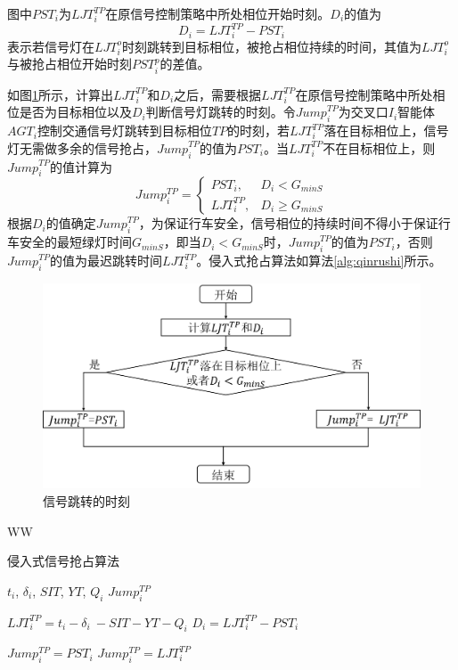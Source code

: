 图中${PST_i}$为${{LJT}_i^{TP}}$在原信号控制策略中所处相位开始时刻。${D_i}$的值为
\begin{equation}
	\label{equation:D_i}
	D_i={LJT}_i^{TP}-PST_i
\end{equation}
表示若信号灯在${{LJT}_i^o}$时刻跳转到目标相位，被抢占相位持续的时间，其值为${{LJT}_i^o}$与被抢占相位开始时刻${{PST}_i^p}$的差值。

如图\ref{fig:jump_time}所示，计算出${{LJT}_i^{TP}}$和${D_i}$之后，需要根据${{LJT}_i^{TP}}$在原信号控制策略中所处相位是否为目标相位以及${D_i}$判断信号灯跳转的时刻。令${{Jump}_i^{TP}}$为交叉口${I_i}$智能体${AGT_i}$控制交通信号灯跳转到目标相位${TP}$的时刻，若${{LJT}_i^{TP}}$落在目标相位上，信号灯无需做多余的信号抢占，${{Jump}_i^{TP}}$的值为${PST_i}$。当${{LJT}_i^{TP}}$不在目标相位上，则${{Jump}_i^{TP}}$的值计算为
\begin{equation}
	Jump_{i}^{TP}=
	\begin{cases}
		PST_{i}, & D_{i}<G_{minS} \\
		LJT_{i}^{TP}, & D_{i}\geqslant G_{minS}
	\end{cases}
	\label{equation:jump}
\end{equation}
根据${D_i}$的值确定${{Jump}_i^{TP}}$，为保证行车安全，信号相位的持续时间不得小于保证行车安全的最短绿灯时间${G_{minS}}$，即当${D_i<G_{minS}}$时，${{Jump}_i^{TP}}$的值为${PST_i}$，否则${{Jump}_i^{TP}}$的值为最迟跳转时间${{LJT}_i^{TP}}$。侵入式抢占算法如算法\ref{alg:qinrushi}所示。

\begin{figure}[ht]
	\centering
	\includegraphics[width=\textwidth]{figures/jump_time.png}
	\caption{信号跳转的时刻}
	\label{fig:jump_time}
\end{figure}WW

\begin{algorithm}[!ht]
	\renewcommand{\algorithmicrequire}{\textbf{Input:}}
	\renewcommand{\algorithmicensure}{\textbf{Output:}}
	\caption{侵入式信号抢占算法}
	\label{alg:qinrushi}
	\begin{algorithmic}[1]
		\REQUIRE ${t_i}$, ${\delta_i}$, ${SIT}$, ${YT}$, ${Q_i}$  %
		\ENSURE ${Jump_i^{TP}}$ %
		
		\STATE ${{LJT}_i^{TP}=t_i-\delta_i\ -SIT-YT-Q_i}$
		\STATE ${D_i={LJT}_i^{TP}-PST_i}$
		
		\STATE ${Jump_i^{TP} = PST_i}$
		\ELSE
		\STATE  ${Jump_i^{TP} = LJT_i^{TP}}$
		\ENDIF
		
	\end{algorithmic}
\end{algorithm}


